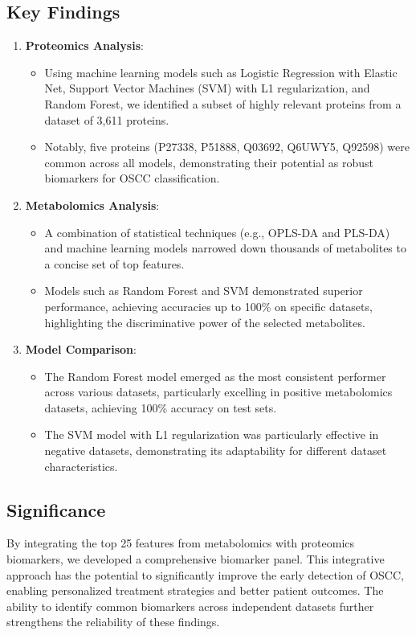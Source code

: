 \documentclass[a4paper,12pt]{article}
\begin{document}
\subsection*{Key Findings}
\begin{enumerate}
	\item \textbf{Proteomics Analysis}:
	      \begin{itemize}
		      \item Using machine learning models such as Logistic Regression with Elastic Net, Support Vector Machines (SVM) with L1 regularization, and Random Forest, we identified a subset of highly relevant proteins from a dataset of 3,611 proteins.
		      \item Notably, five proteins (P27338, P51888, Q03692, Q6UWY5, Q92598) were common across all models, demonstrating their potential as robust biomarkers for OSCC classification.
	      \end{itemize}
	\item \textbf{Metabolomics Analysis}:
	      \begin{itemize}
		      \item A combination of statistical techniques (e.g., OPLS-DA and PLS-DA) and machine learning models narrowed down thousands of metabolites to a concise set of top features.
		      \item Models such as Random Forest and SVM demonstrated superior performance, achieving accuracies up to 100\% on specific datasets, highlighting the discriminative power of the selected metabolites.
	      \end{itemize}
	\item \textbf{Model Comparison}:
	      \begin{itemize}
		      \item The Random Forest model emerged as the most consistent performer across various datasets, particularly excelling in positive metabolomics datasets, achieving 100\% accuracy on test sets.
		      \item The SVM model with L1 regularization was particularly effective in negative datasets, demonstrating its adaptability for different dataset characteristics.
	      \end{itemize}
\end{enumerate}

\subsection*{Significance}
By integrating the top 25 features from metabolomics with proteomics biomarkers, we developed a comprehensive biomarker panel. This integrative approach has the potential to significantly improve the early detection of OSCC, enabling personalized treatment strategies and better patient outcomes. The ability to identify common biomarkers across independent datasets further strengthens the reliability of these findings.
\end{document}

